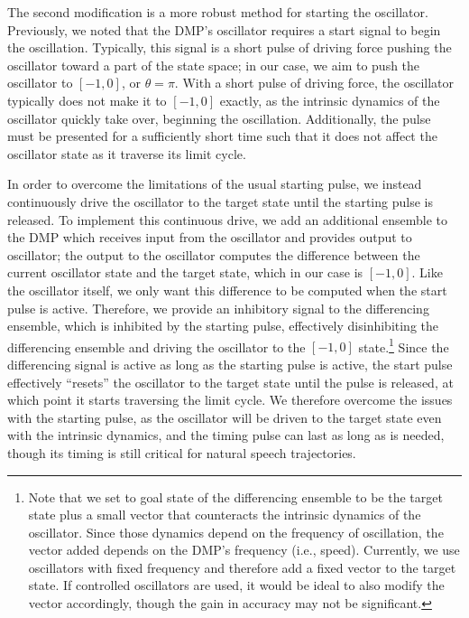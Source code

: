 The second modification is a more robust
method for starting the oscillator.
Previously, we noted that the DMP's oscillator
requires a start signal to begin
the oscillation.
Typically, this signal is a short pulse
of driving force pushing the oscillator
toward a part of the state space;
in our case, we aim to push the oscillator
to $[-1, 0]$, or $\theta=\pi$.
With a short pulse of driving force,
the oscillator typically does not
make it to $[-1, 0]$ exactly,
as the intrinsic dynamics of the oscillator
quickly take over,
beginning the oscillation.
Additionally, the pulse
must be presented for a sufficiently short time
such that it does not affect
the oscillator state as it traverse
its limit cycle.

In order to overcome the limitations
of the usual starting pulse,
we instead continuously drive
the oscillator to the target state
until the starting pulse is released.
To implement this continuous drive,
we add an additional ensemble
to the DMP which receives input
from the oscillator
and provides output to oscillator;
the output to the oscillator
computes the difference between
the current oscillator state
and the target state,
which in our case is $[-1, 0]$.
Like the oscillator itself,
we only want this difference
to be computed when the start pulse
is active.
Therefore, we provide an
inhibitory signal to the differencing ensemble,
which is inhibited by
the starting pulse,
effectively disinhibiting the differencing ensemble
and driving the oscillator
to the $[-1, 0]$ state.\footnote{
  Note that we set to goal state of the
  differencing ensemble to be the target state
  plus a small vector that counteracts the
  intrinsic dynamics of the oscillator.
  Since those dynamics depend on the frequency
  of oscillation, the vector added depends
  on the DMP's frequency (i.e., speed).
  Currently, we use oscillators with
  fixed frequency and therefore add a fixed vector
  to the target state.
  If controlled oscillators are used,
  it would be ideal to also modify
  the vector accordingly,
  though the gain in accuracy may not be significant.}
Since the differencing signal is active
as long as the starting pulse is active,
the start pulse effectively ``resets''
the oscillator to the target state
until the pulse is released,
at which point it starts
traversing the limit cycle.
We therefore overcome the issues with
the starting pulse,
as the oscillator will be driven
to the target state even
with the intrinsic dynamics,
and the timing pulse can
last as long as is needed,
though its timing is still critical
for natural speech trajectories.

